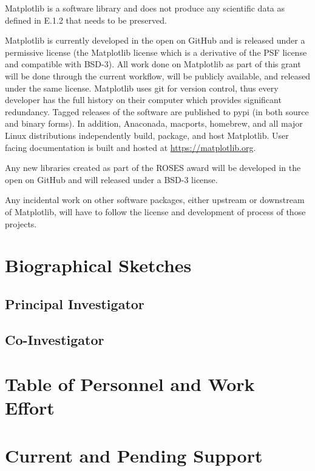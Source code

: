 \documentclass[12pt]{article}
\numberwithin{page}{section}
\begin{document}
Matplotlib is a software library and does not produce any scientific
data as defined in E.1.2 that needs to be preserved.

Matplotlib is currently developed in the open on GitHub and is
released under a permissive license (the Matplotlib license which is a
derivative of the PSF license and compatible with BSD-3).  All work
done on Matplotlib as part of this grant will be done through the
current workflow, will be publicly available, and released under the
same license.  Matplotlib uses git for version control, thus every
developer has the full history on their computer which provides
significant redundancy.  Tagged releases of the software are published
to pypi (in both source and binary forms).  In addition, Anaconada,
macports, homebrew, and all major Linux distributions independently
build, package, and host Matplotlib.  User facing documentation is built
and hosted at \url{https://matplotlib.org}.


Any new libraries created as part of the ROSES award will be developed
in the open on GitHub and will released under a BSD-3 license.

Any incidental work on other software packages, either upstream or
downstream of Matplotlib, will have to follow the license and
development of process of those projects.


\newpage
\section{Biographical Sketches}
\setcounter{page}{1}
\subsection{Principal Investigator}
\newpage
\subsection{Co-Investigator}

\newpage
\section{Table of Personnel and Work Effort}
\setcounter{page}{1}

\newpage
\section{Current and Pending Support}
\setcounter{page}{1}
\end{document}
